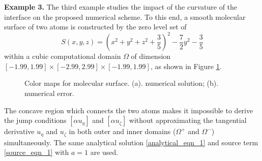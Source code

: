 \documentclass[dissertation]{uathesis}
\begin{document}
\begin{body}
\begin{flushleft}
{\flushleft \bf Example 3.} The third example studies the impact of the curvature of the interface on the proposed numerical scheme. To this end, a smooth molecular surface of two atoms is constructed by the zero level set of 
%
\begin{equation}
S(x,y,z) = (x^{2}+y^{2}+z^{2}+\frac{3}{5})^2 -\frac{7}{2}y^{2} - \frac{3}{5}
\end{equation}
%
within a cubic computational domain $\Omega$ of dimension $[-1.99,1.99]\times[-2.99,2.99]\times[-1.99,1.99]$, as shown in Figure \ref{fig:color_map_molecular}. 
%
\begin{figure}[!ht]
	\begin{center}
	\end{center}
	\caption{Color maps for molecular surface. (a). numerical solution; (b). numerical error.}
	\label{fig:color_map_molecular}
\end{figure}
%
The concave region which connects the two atoms makes it impossible to derive the jump conditions $[\alpha u_{\eta}]$ and $[\alpha u_{\zeta}]$ without approximating the tangential derivative $u_{\eta}$ and $u_{\zeta}$ in both outer and inner domains ($\Omega^{+}$ and $\Omega^{-}$) simultaneously. The same analytical solution \eqref{analytical_eqn_1} and source term \eqref{source_eqn_1} with $a=1$ are used. 



\end{flushleft}
\end{body}
\end{document}
